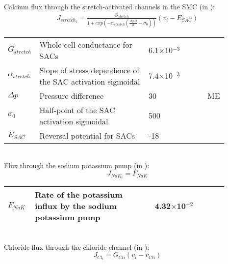 \documentclass[fleqn]{report}
\numberwithin{equation}{section}
\numberwithin{equation}{section}
\begin{document}
	Calcium flux through the stretch-activated channels in the SMC (in \uMs): 
	\begin{equation} \label{eq:Jstretchi}
	\begin{split}
	J_{stretch_{i}}= \frac{G_{stretch}}{1+ exp\left(-\alpha_{stretch}  \left(  \frac{\Delta pR}{h} -\sigma_{0}   \right) \right)}  \left(  v_{i}-E_{SAC}   \right) 
	\end{split}
	\end{equation}
	\begin{table}[h!]
	\centering
	\begin{tabular}{ p{0.09\linewidth}  >{\footnotesize} p{0.5\linewidth}  >{\footnotesize} p{0.27\linewidth} >{\footnotesize} p{0.03\linewidth} }
	\hline
	$G_{stretch}$      		& Whole cell conductance for SACs						& 6.1$\times$10$^{-3}$ \uMpmVs	&\cite{Koenigsberger2006} \\
	$\alpha_{stretch}$      & Slope of stress dependence of the SAC activation sigmoidal	& 7.4$\times$10$^{-3}$ \pmmHg	&\cite{Koenigsberger2006} \\
	$ \Delta p $			& Pressure difference										& 30 \mmHg			& ME \\
	$\sigma_{0}$      		& Half-point of the SAC activation sigmoidal				& 500 \mmHg			&\cite{Koenigsberger2006} \\
	$E_{SAC}$      			& Reversal potential for SACs							& -18 \mV			&\cite{Koenigsberger2006} \\
	\hline
	\end{tabular}
	\label{tab:Jstretchi}
	\end{table}
	\\
	Flux through the sodium potassium pump (in \uMs): 
	\begin{equation} \label{eq:J_NaK_i}
	J_{NaK_{i}}= F_{NaK}
	\end{equation}
	\begin{table}[h!]
	\centering
	\begin{tabular}{ p{0.09\linewidth}  >{\footnotesize} p{0.5\linewidth}  >{\footnotesize} p{0.27\linewidth} >{\footnotesize} p{0.03\linewidth} }
	\hline
	$F_{NaK}$      			& Rate of the potassium influx by the sodium potassium pump 		& 4.32$\times$10$^{-2}$ \uMps 	&\cite{Koenigsberger2006} \\
	\hline
	\end{tabular}
	\label{tab:JCli}
	\end{table}
	\\
	Chloride flux through the chloride channel (in \uMs):
	\begin{equation} \label{eq:JCli}
	J_{Cl_{i}} = G_{Cli} \left(  v_{i} - v_{Cli}  \right) 
	\end{equation}
\end{document}
